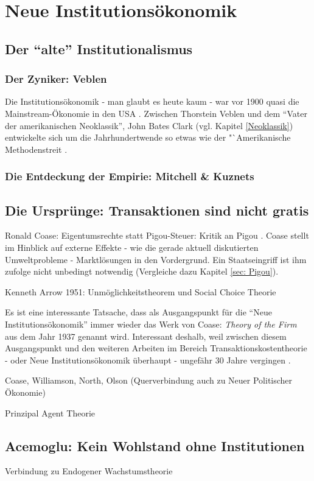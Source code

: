 %
%
%

\chapter{Neue Institutionsökonomik}
\label{Neue Institut}

\section{Der "`alte"' Institutionalismus}

\subsection{Der Zyniker: Veblen}
Die Institutionsökonomik - man glaubt es heute kaum - war vor 1900 quasi die Mainstream-Ökonomie in den USA \parencite[S. 97]{Persky2000}. Zwischen Thorstein Veblen und dem "`Vater der amerikanischen Neoklassik"', John Bates Clark (vgl. Kapitel \ref{Neoklassik}) entwickelte sich um die Jahrhundertwende so etwas wie der "`Amerikanische Methodenstreit \parencite[S. 100]{Persky2000}.

\subsection{Die Entdeckung der Empirie: Mitchell \& Kuznets}


\section{Die Ursprünge: Transaktionen sind nicht gratis} \label{sec: Neue Inst}

Ronald Coase: Eigentumsrechte statt Pigou-Steuer: Kritik an Pigou \textcite[S. 243]{Cansier1989}. Coase stellt im Hinblick auf externe Effekte - wie die gerade aktuell diskutierten Umweltprobleme - Marktlösungen in den Vordergrund. Ein Staatseingriff ist ihm zufolge nicht unbedingt notwendig (Vergleiche dazu Kapitel \ref{sec: Pigou}).

Kenneth Arrow 1951: Unmöglichkeitstheorem und Social Choice Theorie



Es ist eine interessante Tatsache, dass als Ausgangspunkt für die "`Neue Institutionsökonomik"' immer wieder das Werk von Coase: \textit{Theory of the Firm} aus dem Jahr 1937 genannt wird. Interessant deshalb, weil zwischen diesem Ausgangspunkt und den weiteren Arbeiten im Bereich Transaktionskostentheorie -  oder Neue Institutionsökonomik überhaupt - ungefähr 30 Jahre vergingen \parencite[S. 148]{Blaug2001}.

Coase, Williamson, North, Olson (Querverbindung auch zu Neuer Politischer Ökonomie)

Prinzipal Agent Theorie


\section{Acemoglu: Kein Wohlstand ohne Institutionen}
Verbindung zu Endogener Wachstumstheorie \textcite[S. 633ff]{Snowdon2005}

